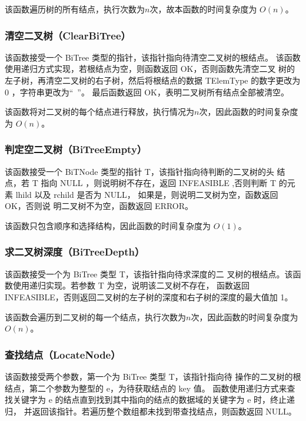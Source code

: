 \documentclass[supercite]{Experimental_Report}
\theoremstyle{definition}
\begin{document}
该函数遍历树的所有结点，执行次数为$n$次，故本函数的时间复杂度为 $O(n)$。

\subsubsection{清空二叉树（ClearBiTree）}

该函数接受一个 BiTree 类型的指针，该指针指向待清空二叉树的根结点。
该函数使用递归方式实现，若根结点为空，则函数返回 OK，否则函数先清空二叉
树的左子树，再清空二叉树的右子树，然后将根结点的数据 TElemType 的数字更改为 0 ，字符串更改为“\ ”。
最后函数返回 OK，表明二叉树所有结点全部被清空。

该函数将对二叉树的每个结点进行释放，执行情况为$n$次，因此函数的时间复杂度为 $O(n)$。

\subsubsection{判定空二叉树（BiTreeEmpty）}

该函数接受一个 BiTNode 类型的指针 T，该指针指向待判断的二叉树的头
结点，若 T 指向 NULL ，则说明树不存在，返回 INFEASIBLE ,否则判断 T 的元素 lhild 以及 rchild 是否为 NULL， 如果是，则说明二叉树为空，函数返回 OK，否则说
明二叉树不为空，函数返回 ERROR。

该函数只包含顺序和选择结构，因此函数的时间复杂度为 $O(1)$。

\subsubsection{求二叉树深度（BiTreeDepth）}

该函数接受一个为 BiTree 类型 T，该指针指向待求深度的二
叉树的根结点。该函数使用递归实现。若参数 T 为空，说明该二叉树不存在，
函数返回 INFEASIBLE，否则返回二叉树的左子树的深度和右子树的深度的最大值加 1。

该函数会遍历到二叉树的每一个结点，执行次数为$n$次，因此函数的时间复杂度为 $O(n)$。

\subsubsection{查找结点（LocateNode）}

该函数接受两个参数，第一个为 BiTree 类型 T，该指针指向待
操作的二叉树的根结点，第二个参数为整型的 e，为待获取结点的 key 值。
函数使用递归方式来查找关键字为 e 的结点直到找到其中指向的结点的数据域的关键字为 e 时，终止递归，
并返回该指针。若遍历整个数组都未找到带查找结点，则函数返回 NULL。
\end{document}
